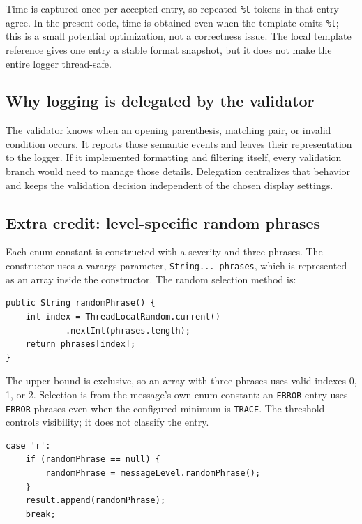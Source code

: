 \documentclass[12pt,a4paper]{article}
\newcommand{\code}[1]{\texttt{#1}}
\begin{document}
Time is captured once per accepted entry, so repeated \code{\%t} tokens in that entry agree. In the present code, time is obtained even when the template omits \code{\%t}; this is a small potential optimization, not a correctness issue. The local template reference gives one entry a stable format snapshot, but it does not make the entire logger thread-safe.

\subsection{Why logging is delegated by the validator}
The validator knows when an opening parenthesis, matching pair, or invalid condition occurs. It reports those semantic events and leaves their representation to the logger. If it implemented formatting and filtering itself, every validation branch would need to manage those details. Delegation centralizes that behavior and keeps the validation decision independent of the chosen display settings.

\subsection{Extra credit: level-specific random phrases}
Each enum constant is constructed with a severity and three phrases. The constructor uses a varargs parameter, \code{String... phrases}, which is represented as an array inside the constructor. The random selection method is:

\begin{samepage}
\begin{lstlisting}
public String randomPhrase() {
    int index = ThreadLocalRandom.current()
            .nextInt(phrases.length);
    return phrases[index];
}
\end{lstlisting}
\end{samepage}

The upper bound is exclusive, so an array with three phrases uses valid indexes 0, 1, or 2. Selection is from the message's own enum constant: an \code{ERROR} entry uses \code{ERROR} phrases even when the configured minimum is \code{TRACE}. The threshold controls visibility; it does not classify the entry.

\begin{samepage}
\begin{lstlisting}
case 'r':
    if (randomPhrase == null) {
        randomPhrase = messageLevel.randomPhrase();
    }
    result.append(randomPhrase);
    break;
\end{lstlisting}
\end{samepage}
\end{document}
